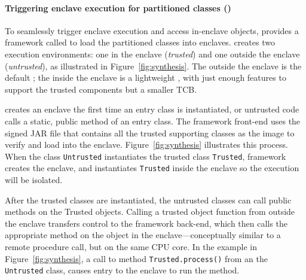 \paragraph{Triggering enclave execution for partitioned \java{} classes (\dynamicframework{})}
To seamlessly trigger enclave execution and access in-enclave objects,
\sysname{} provides a \dynamicphase{} framework called \dynamicframework{} to load the partitioned \java{} classes into enclaves.
\dynamicframework{} creates two \java{} execution environments: 
one in the enclave (\emph{trusted}) and one outside the enclave (\emph{untrusted}), as illustrated in Figure~\ref{fig:synthesis}.
The \jvm{} outside the enclave is the default \jvm{}; the \jvm{} inside the enclave is a lightweight \jvm{},
with just enough features to support the trusted components but a smaller TCB.

 
\dynamicframework{} creates an enclave %
the first time an entry class is instantiated,
or untrusted code calls a static, public method of an entry class.
The \sysname{} framework front-end uses the signed JAR file that
contains all the trusted supporting classes
as the image to verify and load into the enclave.
Figure~\ref{fig:synthesis} illustrates this process.
When the class {\tt Untrusted} instantiates the trusted class {\tt Trusted},
\sysname{} framework creates the enclave,
and instantiates {\tt Trusted} inside the enclave so the execution will be isolated.


After the trusted classes are instantiated, the untrusted classes can call public methods on the Trusted objects.
Calling a trusted object function from outside the enclave transfers control to the \sysname{} framework back-end, which then 
calls the appropriate method on the object in the enclave---conceptually similar to a remote procedure call, but on the same CPU core.
In the example in Figure~\ref{fig:synthesis}, a call to method {\tt Trusted.process()} from an the {\tt Untrusted} class,
causes entry to the enclave to run the method.

